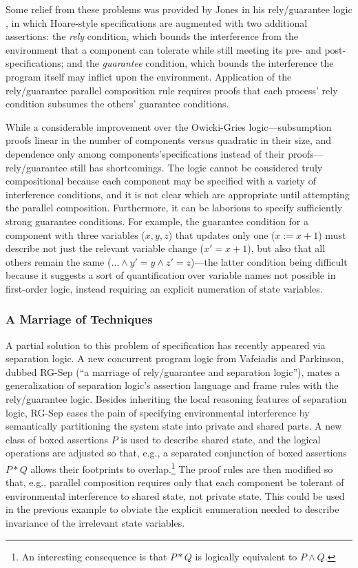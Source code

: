 \documentclass[11pt]{report}
\begin{document}
Some relief from these problems was provided by Jones in his rely/guarantee logic \cite{JonesRelyGuar}, in which Hoare-style specifications are augmented with two additional assertions: the \emph{rely} condition, which bounds the interference from the environment that a component can tolerate while still meeting its pre- and post-specifications; and the \emph{guarantee} condition, which bounds the interference the program itself may inflict upon the environment. Application of the rely/guarantee parallel composition rule requires proofs that each process' rely condition subsumes the others' guarantee conditions.

While a considerable improvement over the Owicki-Gries logic---subsumption proofs linear in the number of components versus quadratic in their size, and dependence only among components'specifications instead of their proofs---rely/guarantee still has shortcomings. The logic cannot be considered truly compositional because each component may be specified with a variety of interference conditions, and it is not clear which are appropriate until attempting the parallel composition. Furthermore, it can be laborious to specify sufficiently strong guarantee conditions. For example, the guarantee condition for a component with three variables ($x,y,z$) that updates only one ($x := x+1$) must describe not just the relevant variable change ($x' = x + 1$), but also that all others remain the same ($\ldots \wedge y' = y \wedge z' = z$)---the latter condition being difficult because it suggests a sort of quantification over variable names not possible in first-order logic, instead requiring an explicit numeration of state variables.

\subsubsection{A Marriage of Techniques}

A partial solution to this problem of specification has recently appeared via separation logic. A new concurrent program logic from Vafeiadis and Parkinson, dubbed RG-Sep \cite{DBLP:conf/concur/VafeiadisP07} (``a marriage of rely/guarantee and separation logic''), mates a generalization of separation logic's assertion language and frame rules with the rely/guarantee logic. Besides inheriting the local reasoning features of separation logic, RG-Sep eases the pain of specifying environmental interference by semantically partitioning the system state into private and shared parts. A new class of boxed assertions $\boxed{P}$ is used to describe shared state, and the logical operations are adjusted so that, e.g., a separated conjunction of boxed assertions $\boxed{P} * \boxed{Q}$ allows their footprints to overlap.\footnote{An interesting consequence is that $\boxed{P} * \boxed{Q}$ is logically equivalent to $\boxed{P \wedge Q}$.} The proof rules are then modified so that, e.g., parallel composition requires only that each component be tolerant of environmental interference to shared state, not private state. This could be used in the previous example to obviate the explicit enumeration needed to describe invariance of the irrelevant state variables.
\end{document}

